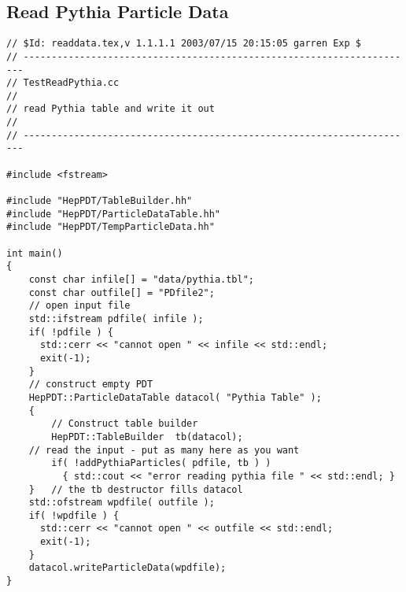\subsection { Read Pythia Particle Data }
\begin{verbatim}
// $Id: readdata.tex,v 1.1.1.1 2003/07/15 20:15:05 garren Exp $
// ----------------------------------------------------------------------
// TestReadPythia.cc
//
// read Pythia table and write it out
//
// ----------------------------------------------------------------------

#include <fstream>

#include "HepPDT/TableBuilder.hh"
#include "HepPDT/ParticleDataTable.hh"
#include "HepPDT/TempParticleData.hh"

int main()
{
    const char infile[] = "data/pythia.tbl";
    const char outfile[] = "PDfile2";
    // open input file
    std::ifstream pdfile( infile );
    if( !pdfile ) { 
      std::cerr << "cannot open " << infile << std::endl;
      exit(-1);
    }
    // construct empty PDT
    HepPDT::ParticleDataTable datacol( "Pythia Table" );
    {
        // Construct table builder
        HepPDT::TableBuilder  tb(datacol);
	// read the input - put as many here as you want
        if( !addPythiaParticles( pdfile, tb ) ) 
	      { std::cout << "error reading pythia file " << std::endl; }
    }	// the tb destructor fills datacol
    std::ofstream wpdfile( outfile );
    if( !wpdfile ) { 
      std::cerr << "cannot open " << outfile << std::endl;
      exit(-1);
    }
    datacol.writeParticleData(wpdfile);
}
\end{verbatim}

